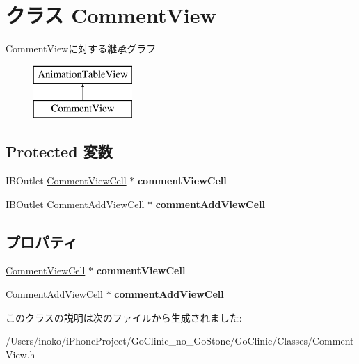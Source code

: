 \hypertarget{interface_comment_view}{
\section{クラス CommentView}
\label{interface_comment_view}
}
CommentViewに対する継承グラフ\begin{figure}[H]
\begin{center}
\leavevmode
\includegraphics[height=2.000000cm]{interface_comment_view}
\end{center}
\end{figure}
\subsection*{Protected 変数}
\begin{DoxyCompactItemize}
\item 
\hypertarget{interface_comment_view_aab589da7d95d73a21552e29b95c72103}{
IBOutlet \hyperlink{interface_comment_view_cell}{CommentViewCell} $\ast$ {\bfseries commentViewCell}}
\label{interface_comment_view_aab589da7d95d73a21552e29b95c72103}

\item 
\hypertarget{interface_comment_view_ac2d04bc29961b274cd89a9d7fedacf91}{
IBOutlet \hyperlink{interface_comment_add_view_cell}{CommentAddViewCell} $\ast$ {\bfseries commentAddViewCell}}
\label{interface_comment_view_ac2d04bc29961b274cd89a9d7fedacf91}

\end{DoxyCompactItemize}
\subsection*{プロパティ}
\begin{DoxyCompactItemize}
\item 
\hypertarget{interface_comment_view_a25f1aae9854f5aec5080757b9b673153}{
\hyperlink{interface_comment_view_cell}{CommentViewCell} $\ast$ {\bfseries commentViewCell}}
\label{interface_comment_view_a25f1aae9854f5aec5080757b9b673153}

\item 
\hypertarget{interface_comment_view_a072d5a87b8400c59de61d90db68024a7}{
\hyperlink{interface_comment_add_view_cell}{CommentAddViewCell} $\ast$ {\bfseries commentAddViewCell}}
\label{interface_comment_view_a072d5a87b8400c59de61d90db68024a7}

\end{DoxyCompactItemize}


このクラスの説明は次のファイルから生成されました:\begin{DoxyCompactItemize}
\item 
/Users/inoko/iPhoneProject/GoClinic\_\-no\_\-GoStone/GoClinic/Classes/CommentView.h\end{DoxyCompactItemize}
